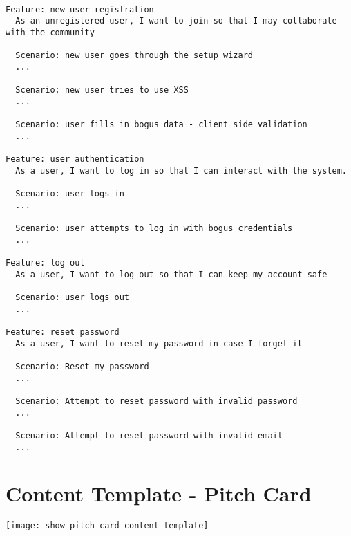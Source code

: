 \begin{verbatim}

Feature: new user registration
  As an unregistered user, I want to join so that I may collaborate with the community

  Scenario: new user goes through the setup wizard
  ...

  Scenario: new user tries to use XSS
  ...

  Scenario: user fills in bogus data - client side validation
  ...

Feature: user authentication
  As a user, I want to log in so that I can interact with the system.

  Scenario: user logs in
  ...

  Scenario: user attempts to log in with bogus credentials
  ...

Feature: log out
  As a user, I want to log out so that I can keep my account safe

  Scenario: user logs out
  ...

Feature: reset password
  As a user, I want to reset my password in case I forget it

  Scenario: Reset my password
  ...

  Scenario: Attempt to reset password with invalid password
  ...
  
  Scenario: Attempt to reset password with invalid email
  ...

\end{verbatim}

\chapter{Content Template - Pitch Card}\label{A:content_template}

\texttt{[image: show\_pitch\_card\_content\_template]}


